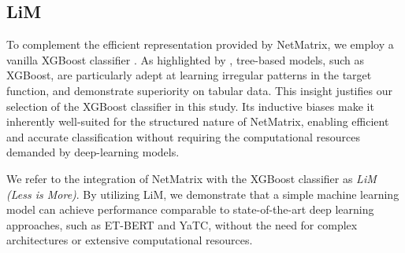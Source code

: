 \subsection{LiM}
\label{subsec:lim}

To complement the efficient representation provided by NetMatrix, we employ a vanilla XGBoost classifier \cite{xgboost}. As highlighted by \cite{xgboost_tabular_data}, tree-based models, such as XGBoost, are particularly adept at learning irregular patterns in the target function, and demonstrate superiority on tabular data. This insight justifies our selection of the XGBoost classifier in this study. Its inductive biases make it inherently well-suited for the structured nature of NetMatrix, enabling efficient and accurate classification without requiring the computational resources demanded by deep-learning models.



We refer to the integration of NetMatrix with the XGBoost classifier as \textit{LiM (Less is More)}. By utilizing LiM, we demonstrate that a simple machine learning model can achieve performance comparable to state-of-the-art deep learning approaches, such as ET-BERT and YaTC, without the need for complex architectures or extensive computational resources.